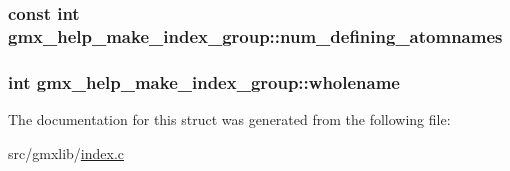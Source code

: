 \hypertarget{structgmx__help__make__index__group_a375ec9a0be0ca152a884bf0ec616a708}{
\subsubsection[{num\-\_\-defining\-\_\-atomnames}]{\setlength{\rightskip}{0pt plus 5cm}const int {\bf gmx\-\_\-help\-\_\-make\-\_\-index\-\_\-group\-::num\-\_\-defining\-\_\-atomnames}}}\label{structgmx__help__make__index__group_a375ec9a0be0ca152a884bf0ec616a708}
\hypertarget{structgmx__help__make__index__group_aed7614d311ad5b8f088cdbf4e08dfaea}{
\subsubsection[{wholename}]{\setlength{\rightskip}{0pt plus 5cm}int {\bf gmx\-\_\-help\-\_\-make\-\_\-index\-\_\-group\-::wholename}}}\label{structgmx__help__make__index__group_aed7614d311ad5b8f088cdbf4e08dfaea}


\-The documentation for this struct was generated from the following file\-:\begin{DoxyCompactItemize}
\item 
src/gmxlib/\hyperlink{index_8c}{index.\-c}\end{DoxyCompactItemize}
